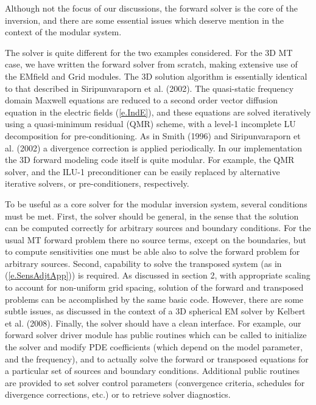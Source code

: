 Although not the focus of our discussions,
the forward solver is the core of the inversion, and
there are some essential issues which deserve mention
in the context of the modular system.

The solver is quite different for the two examples considered.
For the 3D MT case, we have written the forward solver from scratch,
making extensive use of the EMfield and Grid modules.
The 3D solution algorithm is essentially identical
to that described in Siripunvaraporn et al. (2002). 
The quasi-static frequency domain Maxwell equations are reduced to a second
order vector diffusion equation in the electric fields (\ref{e.IndE}),
and these equations are solved iteratively using
a quasi-minimum residual (QMR) scheme, with
a level-1 incomplete LU decomposition for pre-conditioning.
As in Smith (1996) and Siripunvaraporn et al. (2002)
a divergence correction is applied periodically.
In our implementation the 3D forward modeling code itself
is quite modular.  For example, the QMR solver, and the ILU-1
preconditioner can be easily replaced by alternative
iterative solvers, or pre-conditioners, respectively.

To be useful as a core solver for the modular inversion
system, several conditions must be met.  First, the solver
should be general, in the sense that the solution can be
computed correctly for arbitrary sources and boundary conditions.
For the usual MT forward problem there no source terms, except
on the boundaries, but to compute sensitivities one must
be able also to solve the forward problem for arbitrary sources.
Second, capability to solve the transposed system 
(as in (\ref{e.SensAdjtApp})) is required.  As discussed in section 2,
with appropriate scaling to account for non-uniform grid spacing,
solution of the forward and transposed problems can be
accomplished by the same basic code.  However, there are some
subtle issues, as discussed in the context of a 3D spherical
EM solver by Kelbert et al. (2008).  Finally, the solver should
have a clean interface.  For example, our forward solver driver
module has public routines which can be called to initialize
the solver and modify PDE coefficients (which depend on
the model parameter, and the frequency), and to actually solve
the forward or transposed equations for a particular 
set of sources and boundary conditions.  Additional public routines
are provided to set solver control parameters (convergence criteria,
schedules for divergence corrections, etc.) or to retrieve solver
diagnostics.

